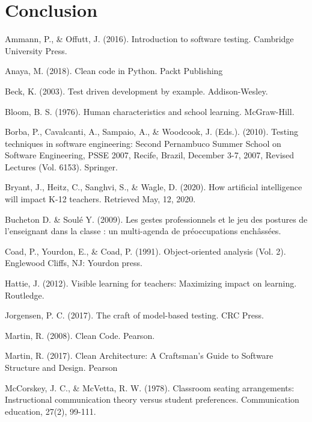 \documentclass[10pt]{article}
\begin{document}
\section{Conclusion}





\begin{thebibliography}{Xyzz12}

 Ammann, P., \& Offutt, J. (2016). Introduction to software testing. Cambridge University Press.

 Anaya, M. (2018). Clean code in Python. Packt Publishing

 Beck, K. (2003). Test driven development by example. Addison-Wesley.

 Bloom, B. S. (1976). Human characteristics and school learning. McGraw-Hill.

 Borba, P., Cavalcanti, A., Sampaio, A., \& Woodcook, J. (Eds.). (2010). Testing techniques in software engineering: Second Pernambuco Summer School on Software Engineering, PSSE 2007, Recife, Brazil, December 3-7, 2007, Revised Lectures (Vol. 6153). Springer.

 Bryant, J., Heitz, C., Sanghvi, S., \& Wagle, D. (2020). How artificial intelligence will impact K-12 teachers. Retrieved May, 12, 2020.

 Bucheton D. \& Soulé Y. (2009). Les gestes professionnels et le jeu des postures de l’enseignant dans la classe : un multi-agenda de préoccupations enchâssées.

 Coad, P., Yourdon, E., \& Coad, P. (1991). Object-oriented analysis (Vol. 2). Englewood Cliffs, NJ: Yourdon press.

 Hattie, J. (2012). Visible learning for teachers: Maximizing impact on learning. Routledge.

 Jorgensen, P. C. (2017). The craft of model-based testing. CRC Press.

 Martin, R. (2008). Clean Code. Pearson.

 Martin, R. (2017). Clean Architecture: A Craftsman’s Guide to Software Structure and Design. Pearson

 McCorskey, J. C., \& McVetta, R. W. (1978). Classroom seating arrangements: Instructional communication theory versus student preferences. Communication education, 27(2), 99-111.


\end{thebibliography}
\end{document}

